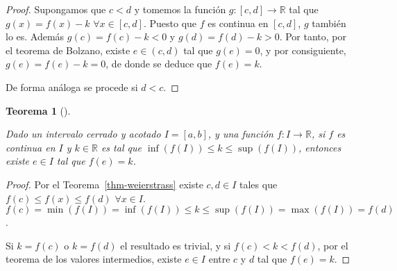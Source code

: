 \documentclass[
  a4paper,
]{scrreport}
\theoremstyle{definition}
\theoremstyle{definition}
\theoremstyle{definition}
\theoremstyle{plain}
\newtheorem{theorem}{Teorema}[chapter]
\theoremstyle{plain}
\theoremstyle{plain}
\theoremstyle{remark}
\begin{document}
\begin{tcolorbox}[enhanced jigsaw, bottomtitle=1mm, title=\textcolor{quarto-callout-note-color}{\faInfo}\hspace{0.5em}{Demostración}, colbacktitle=quarto-callout-note-color!10!white, coltitle=black, leftrule=.75mm, colback=white, toptitle=1mm, toprule=.15mm, titlerule=0mm, opacitybacktitle=0.6, colframe=quarto-callout-note-color-frame, bottomrule=.15mm, arc=.35mm, rightrule=.15mm, breakable, left=2mm, opacityback=0]

\begin{proof}
Supongamos que \(c<d\) y tomemos la función \(g:[c,d]\to\mathbb{R}\) tal
que \(g(x)=f(x)-k\) \(\forall x\in[c,d]\). Puesto que \(f\) es continua
en \([c,d]\), \(g\) también lo es. Además \(g(c)=f(c)-k<0\) y
\(g(d)=f(d)-k>0\). Por tanto, por el teorema de Bolzano, existe
\(e\in(c,d)\) tal que \(g(e)=0\), y por consiguiente, \(g(e)=f(e)-k=0\),
de donde se deduce que \(f(e)=k\).

De forma análoga se procede si \(d<c\).
\end{proof}

\end{tcolorbox}

\begin{theorem}[]\protect\hypertarget{thm-valores-intermedios}{}\label{thm-valores-intermedios}

Dado un intervalo cerrado y acotado \(I=[a,b]\), y una función
\(f:I\to\mathbb{R}\), si \(f\) es continua en \(I\) y \(k\in\mathbb{R}\)
es tal que \(\inf(f(I))\leq k\leq \sup(f(I))\), entonces existe
\(e\in I\) tal que \(f(e)=k\).

\end{theorem}

\begin{tcolorbox}[enhanced jigsaw, bottomtitle=1mm, title=\textcolor{quarto-callout-note-color}{\faInfo}\hspace{0.5em}{Demostración}, colbacktitle=quarto-callout-note-color!10!white, coltitle=black, leftrule=.75mm, colback=white, toptitle=1mm, toprule=.15mm, titlerule=0mm, opacitybacktitle=0.6, colframe=quarto-callout-note-color-frame, bottomrule=.15mm, arc=.35mm, rightrule=.15mm, breakable, left=2mm, opacityback=0]

\begin{proof}
Por el Teorema~\ref{thm-weierstrass} existe \(c,d\in I\) tales que
\(f(c)\leq f(x)\leq f(d)\) \(\forall x\in I\).
\(f(c)=\min(f(I))=\inf(f(I))\leq k\leq \sup(f(I))=\max(f(I))=f(d)\).

Si \(k=f(c)\) o \(k=f(d)\) el resultado es trivial, y si
\(f(c)<k<f(d)\), por el teorema de los valores intermedios, existe
\(e\in I\) entre \(c\) y \(d\) tal que \(f(e)=k\).
\end{proof}

\end{tcolorbox}
\end{document}
